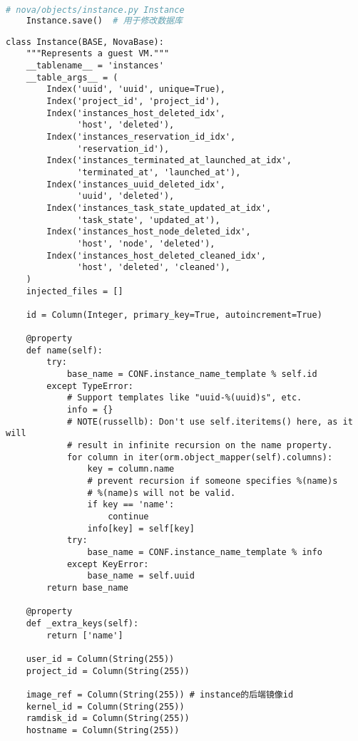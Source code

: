 \documentclass[a4paper,left=1.5cm,right=1.5cm,11pt]{article}
\begin{document}
    \begin{lstlisting}[language = python]
    # nova/objects/instance.py Instance
    Instance.save()  # 用于修改数据库
    \end{lstlisting}

    \begin{lstlisting}
class Instance(BASE, NovaBase):
    """Represents a guest VM."""
    __tablename__ = 'instances'
    __table_args__ = (
        Index('uuid', 'uuid', unique=True),
        Index('project_id', 'project_id'),
        Index('instances_host_deleted_idx',
              'host', 'deleted'),
        Index('instances_reservation_id_idx',
              'reservation_id'),
        Index('instances_terminated_at_launched_at_idx',
              'terminated_at', 'launched_at'),
        Index('instances_uuid_deleted_idx',
              'uuid', 'deleted'),
        Index('instances_task_state_updated_at_idx',
              'task_state', 'updated_at'),
        Index('instances_host_node_deleted_idx',
              'host', 'node', 'deleted'),
        Index('instances_host_deleted_cleaned_idx',
              'host', 'deleted', 'cleaned'),
    )
    injected_files = []

    id = Column(Integer, primary_key=True, autoincrement=True)

    @property
    def name(self):
        try:
            base_name = CONF.instance_name_template % self.id
        except TypeError:
            # Support templates like "uuid-%(uuid)s", etc.
            info = {}
            # NOTE(russellb): Don't use self.iteritems() here, as it will
            # result in infinite recursion on the name property.
            for column in iter(orm.object_mapper(self).columns):
                key = column.name
                # prevent recursion if someone specifies %(name)s
                # %(name)s will not be valid.
                if key == 'name':
                    continue
                info[key] = self[key]
            try:
                base_name = CONF.instance_name_template % info
            except KeyError:
                base_name = self.uuid
        return base_name

    @property
    def _extra_keys(self):
        return ['name']

    user_id = Column(String(255))
    project_id = Column(String(255))

    image_ref = Column(String(255)) # instance的后端镜像id
    kernel_id = Column(String(255))
    ramdisk_id = Column(String(255))
    hostname = Column(String(255))


\end{lstlisting}
\end{document}
